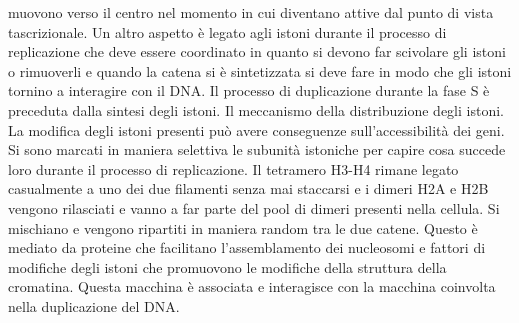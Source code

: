 muovono verso il centro nel momento in cui diventano attive dal punto di vista tascrizionale. Un altro aspetto \`e legato agli istoni durante il processo di replicazione che deve essere
coordinato in quanto si devono far scivolare gli istoni o rimuoverli e quando la catena si \`e sintetizzata si deve fare in modo che gli istoni tornino a interagire con il DNA. Il 
processo di duplicazione durante la fase S \`e preceduta dalla sintesi degli istoni. Il meccanismo della distribuzione degli istoni. La modifica degli istoni presenti pu\`o avere 
conseguenze sull'accessibilit\`a dei geni. Si sono marcati in maniera selettiva le subunit\`a istoniche per capire cosa succede loro durante il processo di replicazione. Il tetramero 
H3-H4 rimane legato casualmente a uno dei due filamenti senza  mai staccarsi e i dimeri H2A e H2B vengono rilasciati e vanno a far parte del pool di dimeri presenti nella cellula. Si 
mischiano e vengono ripartiti in maniera random tra le due catene. Questo \`e mediato da proteine che facilitano l'assemblamento dei nucleosomi e fattori di modifiche degli istoni che 
promuovono le modifiche della struttura della cromatina. Questa macchina \`e associata e interagisce con la macchina coinvolta nella duplicazione del DNA. 
